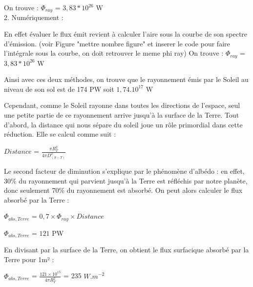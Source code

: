 \documentclass[a4paper, 12pt]{report} %
\begin{document}
\noindent On trouve :
$\Phi_{ray}$ = $3,83*10^{26}$ W  \\

2. Numériquement : \vspace{\baselineskip}

En effet évaluer le flux émit revient à calculer l'aire sous la courbe de son spectre d'émission. (voir Figure  "mettre nombre figure" et inserer 
le code pour faire l'intégrale sous la courbe, on doit retrouver le meme phi ray) \vspace{\baselineskip}
\newline On trouve :
$\Phi_{ray}$ = $3,83*10^{26}$ W \vspace{\baselineskip}

Ainsi avec ces deux méthodes, on trouve que le rayonnement émis par le Soleil au niveau de son sol
est de 174 PW  soit $1,74.10^{17}$ W \vspace{\baselineskip}
\vspace{\baselineskip}
\vspace{\baselineskip}


Cependant, comme le Soleil rayonne dans toutes les directions de l’espace, seul une petite partie de ce rayonnement arrive jusqu’à la surface de la Terre. 
Tout d’abord, la distance qui nous sépare du soleil joue un rôle primordial dans cette réduction. 
\newline Elle se calcul comme suit :
\begin{center}
$Distance$ = $\frac{\pi R_T^{2}}{4 \pi D_{(S-T)}^{2}}$    
\end{center}

Le second facteur de diminution s’explique par le phénomène d’albédo : en effet, 30\% du rayonnement qui parvient jusqu’à la Terre est réfléchis par notre planète, donc seulement 70\% du rayonnement est absorbé. 
\newline On peut alors calculer le flux absorbé par la Terre : 
\begin{center}
$\Phi_{abs,Terre}$ = $0,7 \times \Phi_{ray} \times Distance$    
\end{center}
\begin{center}
$\Phi_{abs,Terre}$ = $121$ PW    
\end{center}

En divisant par la surface de la Terre, 
on obtient le flux surfacique absorbé par la Terre pour 1m² :
\begin{center}
$\Phi_{abs,Terre}$ = $\frac {121 \times 10^{15}}{4 \pi R_T^{2}}$
= 235 $W.m^{-2}$
\end{center}
\end{document}
